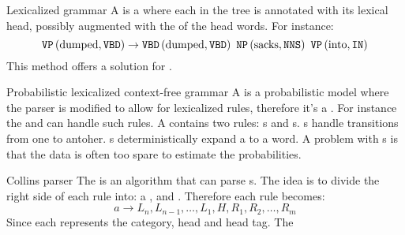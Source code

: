 \begin{df}{Lexicalized grammar}
A \sb{} is a  where each  in the tree is annotated with its lexical head, possibly augmented with the  of the head words. For instance:
\begin{equation}
\fun{\mbox{\texttt{VP}}}{\mbox{dumped},\mbox{\texttt{VBD}}}\rightarrow\fun{\mbox{\texttt{VBD}}}{\mbox{dumped},\mbox{\texttt{VBD}}}\ \fun{\mbox{\texttt{NP}}}{\mbox{sacks},\mbox{\texttt{NNS}}}\ \fun{\mbox{\texttt{VP}}}{\mbox{into},\mbox{\texttt{IN}}}
\end{equation}
This method offers a solution for .
\end{df}
\begin{df}[PLCFG]{Probabilistic lexicalized context-free grammar}
A \sb{} is a probabilistic model where the parser is modified to allow for lexicalized rules, therefore it's a . For instance the  and  can handle such rules. A \sb{} contains two rules: s and s. s handle transitions from one  to antoher. s deterministically expand a  to a word. A problem with \sb{}s is that the data is often too spare to estimate the probabilities.
\end{df}
\begin{df}{Collins parser}
The \sb{} is an algorithm that can parse s. The idea is to divide the right side of each rule into: a ,  and . Therefore each rule becomes:
\begin{equation}
a\rightarrow L_n, L_{n-1},\ldots,L_1,H,R_1,R_2,\ldots,R_m
\end{equation}
Since each  represents the category, head and head tag. The \sb{}
\end{df}